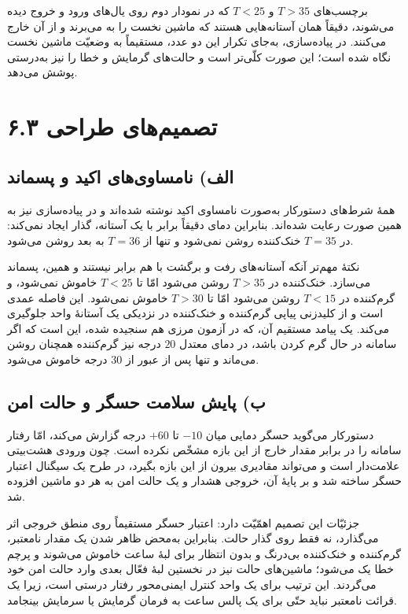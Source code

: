 \documentclass[12pt,a4paper]{article}
\begin{document}
	برچسب‌های \(T>35\) و \(T<25\) که در نمودار دوم روی یال‌های ورود و خروج  دیده می‌شوند، دقیقاً همان آستانه‌هایی هستند که ماشین نخست را به  می‌برند و از آن خارج می‌کنند. در پیاده‌سازی، به‌جای تکرار این دو عدد، مستقیماً به وضعیّت ماشین نخست نگاه شده است؛ این صورت کلّی‌تر است و حالت‌های گرمایش و خطا را نیز به‌درستی پوشش می‌دهد.

	\section*{۶.۳ تصمیم‌های طراحی}
	\subsection*{الف) نامساوی‌های اکید و پسماند}
	همهٔ شرط‌های دستورکار به‌صورت نامساوی اکید نوشته شده‌اند و در پیاده‌سازی نیز به همین صورت رعایت شده‌اند. بنابراین دمای دقیقاً برابر با یک آستانه، گذار ایجاد نمی‌کند: در \(T=35\) خنک‌کننده روشن نمی‌شود و تنها از \(T=36\) به بعد روشن می‌شود.

	نکتهٔ مهم‌تر آنکه آستانه‌های رفت و برگشت با هم برابر نیستند و همین، پسماند می‌سازد. خنک‌کننده در \(T>35\) روشن می‌شود امّا تا \(T<25\) خاموش نمی‌شود، و گرم‌کننده در \(T<15\) روشن می‌شود امّا تا \(T>30\) خاموش نمی‌شود. این فاصله عمدی است و از کلیدزنی پیاپی گرم‌کننده و خنک‌کننده در نزدیکی یک آستانهٔ واحد جلوگیری می‌کند. یک پیامد مستقیم آن، که در آزمون مرزی هم سنجیده شده، این است که اگر سامانه در حال گرم کردن باشد، در دمای معتدل \(20\) درجه نیز گرم‌کننده همچنان روشن می‌ماند و تنها پس از عبور از \(30\) درجه خاموش می‌شود.

	\subsection*{ب) پایش سلامت حسگر و حالت امن}
	دستورکار می‌گوید حسگر دمایی میان \(-10\) تا \(+60\) درجه گزارش می‌کند، امّا رفتار سامانه را در برابر مقدار خارج از این بازه مشخّص نکرده است. چون ورودی هشت‌بیتی علامت‌دار است و می‌تواند مقادیری بیرون از این بازه بگیرد، در طرح یک سیگنال اعتبار حسگر ساخته شد و بر پایهٔ آن، خروجی هشدار  و یک حالت امن به هر دو ماشین افزوده شد.

	جزئیّات این تصمیم اهمّیّت دارد: اعتبار حسگر مستقیماً روی منطق خروجی اثر می‌گذارد، نه فقط روی گذار حالت. بنابراین به‌محض ظاهر شدن یک مقدار نامعتبر، گرم‌کننده و خنک‌کننده بی‌درنگ و بدون انتظار برای لبهٔ ساعت خاموش می‌شوند و پرچم خطا یک می‌شود؛ ماشین‌های حالت نیز در نخستین لبهٔ فعّال بعدی وارد حالت امن خود می‌گردند. این ترتیب برای یک واحد کنترل ایمنی‌محور رفتار درستی است، زیرا یک قرائت نامعتبر نباید حتّی برای یک پالس ساعت به فرمان گرمایش یا سرمایش بینجامد.
\end{document}
